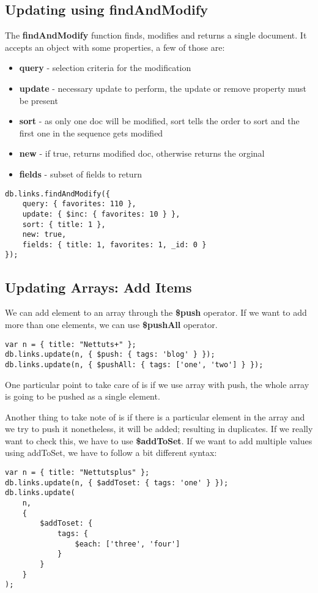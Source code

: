 \documentclass[a4paper, 12pt]{article}
\begin{document}
\subsection{Updating using findAndModify}
The \textbf{findAndModify} function finds, modifies and returns a single document. It accepts an object with some properties, a few of those are:
\begin{itemize}
    \item \textbf{query} - selection criteria for the modification
    \item \textbf{update} - necessary update to perform, the update or remove property must be present
    \item \textbf{sort} - as only one doc will be modified, sort tells the order to sort and the first one in the sequence gets modified
    \item \textbf{new} - if true, returns modified doc, otherwise returns the orginal
    \item \textbf{fields} - subset of fields to return
\end{itemize}
\begin{verbatim}
db.links.findAndModify({
    query: { favorites: 110 },
    update: { $inc: { favorites: 10 } },
    sort: { title: 1 },
    new: true,
    fields: { title: 1, favorites: 1, _id: 0 }
});
\end{verbatim}
\subsection{Updating Arrays: Add Items}
We can add element to an array through the \textbf{\$push} operator. If we want to add more than one elements, we can use \textbf{\$pushAll} operator.
\begin{verbatim}
var n = { title: "Nettuts+" };
db.links.update(n, { $push: { tags: 'blog' } });
db.links.update(n, { $pushAll: { tags: ['one', 'two'] } });
\end{verbatim}
One particular point to take care of is if we use array with push, the whole array is going to be pushed as a single element.

Another thing to take note of is if there is a particular element in the array and we try to push it nonetheless, it will be added; resulting in duplicates. If we really want to check this, we have to use \textbf{\$addToSet}. If we want to add multiple values using addToSet, we have to follow a bit different syntax:
\begin{verbatim}
var n = { title: "Nettutsplus" };
db.links.update(n, { $addToset: { tags: 'one' } });
db.links.update(
    n, 
    { 
        $addToset: { 
            tags: { 
                $each: ['three', 'four'] 
            } 
        } 
    }
);
\end{verbatim}
\end{document}
